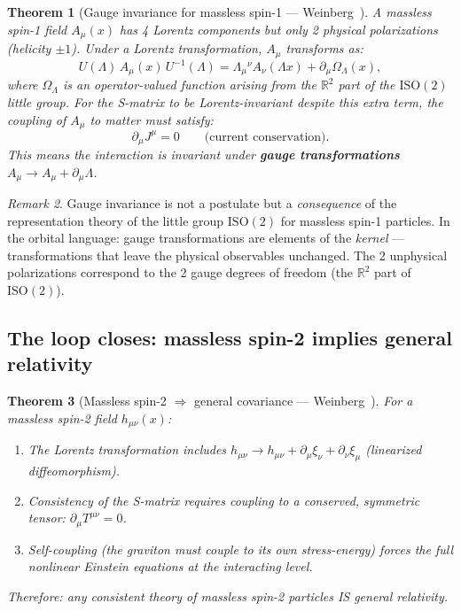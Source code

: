 \documentclass[12pt]{article}
\theoremstyle{plain}
\newtheorem{theorem}{Theorem}[section]
\theoremstyle{definition}
\theoremstyle{remark}
\newtheorem{remark}[theorem]{Remark}
\newcommand{\ISO}{\mathrm{ISO}}
\begin{document}
\begin{theorem}[Gauge invariance for massless spin-1 --- Weinberg~\cite{weinberg1964a}]\label{thm:gauge}
A massless spin-1 field $A_\mu(x)$ has 4 Lorentz components but only 2 physical polarizations (helicity $\pm 1$). Under a Lorentz transformation, $A_\mu$ transforms as:
\begin{equation}\label{eq:gauge-transform}
U(\Lambda)\,A_\mu(x)\,U^{-1}(\Lambda) = \Lambda_\mu{}^\nu A_\nu(\Lambda x) + \partial_\mu\Omega_\Lambda(x),
\end{equation}
where $\Omega_\Lambda$ is an operator-valued function arising from the $\mathbb{R}^2$ part of the $\ISO(2)$ little group. For the S-matrix to be Lorentz-invariant despite this extra term, the coupling of $A_\mu$ to matter must satisfy:
\begin{equation}
\partial_\mu J^\mu = 0 \qquad \text{(current conservation)}.
\end{equation}
This means the interaction is invariant under \textbf{gauge transformations} $A_\mu \to A_\mu + \partial_\mu\Lambda$.
\end{theorem}

\begin{remark}
Gauge invariance is not a postulate but a \emph{consequence} of the representation theory of the little group $\ISO(2)$ for massless spin-1 particles. In the orbital language: gauge transformations are elements of the \emph{kernel} --- transformations that leave the physical observables unchanged. The 2 unphysical polarizations correspond to the 2 gauge degrees of freedom (the $\mathbb{R}^2$ part of $\ISO(2)$).
\end{remark}

\subsection{The loop closes: massless spin-2 implies general relativity}

\begin{theorem}[Massless spin-2 $\Rightarrow$ general covariance --- Weinberg~\cite{weinberg1964b,weinberg1965}]\label{thm:spin2-gr}
For a massless spin-2 field $h_{\mu\nu}(x)$:
\begin{enumerate}[label=(\alph*)]
    \item The Lorentz transformation includes $h_{\mu\nu} \to h_{\mu\nu} + \partial_\mu\xi_\nu + \partial_\nu\xi_\mu$ (linearized diffeomorphism).
    \item Consistency of the S-matrix requires coupling to a conserved, symmetric tensor: $\partial_\mu T^{\mu\nu} = 0$.
    \item Self-coupling (the graviton must couple to its own stress-energy) forces the full nonlinear Einstein equations at the interacting level.
\end{enumerate}
Therefore: any consistent theory of massless spin-2 particles IS general relativity.
\end{theorem}
\end{document}

